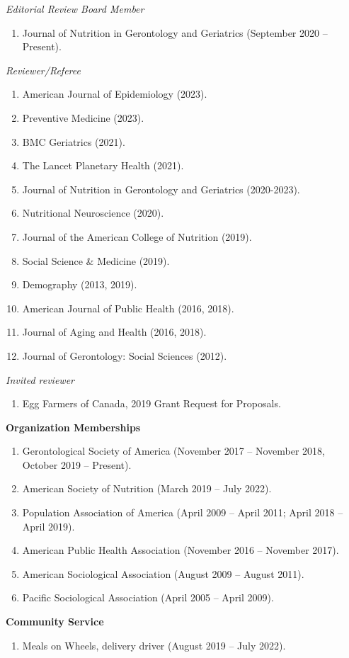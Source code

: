 \documentclass[
]{article}
\providecommand{\tightlist}{%
  \setlength{\itemsep}{0pt}\setlength{\parskip}{0pt}}
\begin{document}
\emph{Editorial Review Board Member}

\begin{enumerate}
\def\labelenumi{\arabic{enumi}.}
\tightlist
\item
  Journal of Nutrition in Gerontology and Geriatrics (September 2020 --
  Present).
\end{enumerate}

\emph{Reviewer/Referee}

\begin{enumerate}
\def\labelenumi{\arabic{enumi}.}
\item
  American Journal of Epidemiology (2023).
\item
  Preventive Medicine (2023).
\item
  BMC Geriatrics (2021).
\item
  The Lancet Planetary Health (2021).
\item
  Journal of Nutrition in Gerontology and Geriatrics (2020-2023).
\item
  Nutritional Neuroscience (2020).
\item
  Journal of the American College of Nutrition (2019).
\item
  Social Science \& Medicine (2019).
\item
  Demography (2013, 2019).
\item
  American Journal of Public Health (2016, 2018).
\item
  Journal of Aging and Health (2016, 2018).
\item
  Journal of Gerontology: Social Sciences (2012).
\end{enumerate}

\emph{Invited reviewer}

\begin{enumerate}
\def\labelenumi{\arabic{enumi}.}
\tightlist
\item
  Egg Farmers of Canada, 2019 Grant Request for Proposals.
\end{enumerate}

\textbf{Organization Memberships}

\begin{enumerate}
\def\labelenumi{\arabic{enumi}.}
\item
  Gerontological Society of America (November 2017 -- November 2018,
  October 2019 -- Present).
\item
  American Society of Nutrition (March 2019 -- July 2022).
\item
  Population Association of America (April 2009 -- April 2011; April
  2018 -- April 2019).
\item
  American Public Health Association (November 2016 -- November 2017).
\item
  American Sociological Association (August 2009 -- August 2011).
\item
  Pacific Sociological Association (April 2005 -- April 2009).
\end{enumerate}

\textbf{Community Service}

\begin{enumerate}
\def\labelenumi{\arabic{enumi}.}
\tightlist
\item
  Meals on Wheels, delivery driver (August 2019 -- July 2022).
\end{enumerate}
\end{document}
